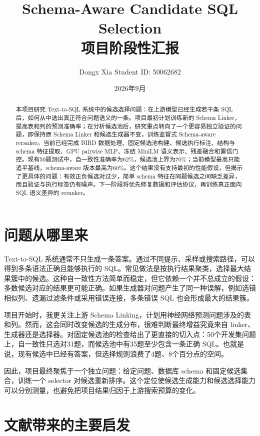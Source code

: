 \documentclass[UTF8,11pt,fontset=windows]{ctexart}
\title{\vspace{-1.8em}\textbf{Schema-Aware Candidate SQL Selection}\\[0.35em]
\large 项目阶段性汇报}
\author{Dongx Xia \quad Student ID: 50062682}
\date{2026年9月}
\begin{document}
\maketitle
\vspace{-1.5em}

\begin{abstract}
本项目研究 Text-to-SQL 系统中的候选选择问题：在上游模型已经生成若干条 SQL 后，如何从中选出真正符合问题语义的一条。项目最初计划训练新的 Schema Linker，提高表和列的预测准确率；在分析候选池后，研究重点转向了一个更容易独立验证的问题，即保持原 Schema Linker 和候选生成器不变，训练监督式 Schema-aware reranker。当前已经完成 BIRD 数据处理、固定候选池构建、候选执行标注、结构与 schema 特征提取、GPU pairwise MLP、冻结 MiniLM 语义表示、残差融合和置信门控。现有50题测试中，自一致性准确率为62\%，候选池上界为70\%；当前模型最高只能追平基线，schema-aware 版本最高为60\%。这个结果没有支持最初的性能假设，但揭示了更具体的问题：有效正负候选对过少，简单 schema 特征在同题候选之间缺乏差异，而且验证与执行标签仍有噪声。下一阶段将优先修复数据和评估协议，再训练真正面向 SQL 语义差异的 reranker。
\end{abstract}

\section{问题从哪里来}

Text-to-SQL 系统通常不只生成一条答案。通过不同提示、采样或搜索路径，可以得到多条语法正确且能够执行的 SQL。常见做法是按执行结果聚类，选择最大结果簇中的候选。这种自一致性方法简单而稳定，但它依赖一个并不总成立的假设：多数候选对应的结果更可能正确。如果生成器对问题产生了同一种误解，例如选错相似列、遗漏过滤条件或采用错误连接，多条错误 SQL 也会形成最大的结果簇。

项目开始时，我更关注上游 Schema Linking，计划用神经网络预测问题涉及的表和列。然而，这会同时改变候选的生成分布，很难判断最终增益究竟来自 linker、生成器还是选择器。对固定候选池的检查给出了更直接的切入点：50个开发集问题上，自一致性只选对31题，而候选池中有35题至少包含一条正确 SQL。也就是说，现有候选中已经有答案，但选择规则浪费了4题、8个百分点的空间。

因此，项目最终聚焦于一个独立问题：给定问题、数据库 schema 和固定候选集合，训练一个 selector 对候选重新排序。这个定位使候选生成能力和候选选择能力可以分别测量，也避免把项目结果归因于上游搜索预算的变化。

\section{文献带来的主要启发}
\end{document}
